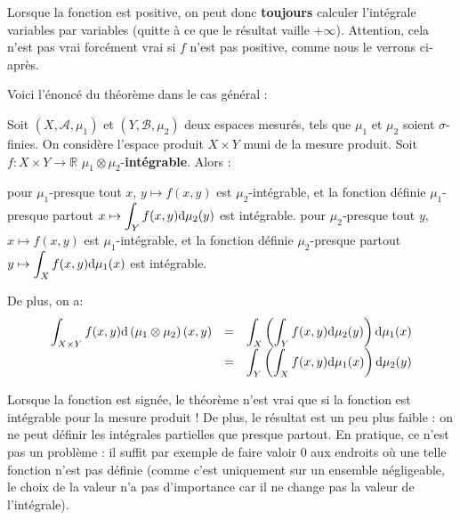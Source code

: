 \documentclass[../integ-proba.tex]{subfiles}
\begin{document}
  \begin{rem}
    Lorsque la fonction est positive, on peut donc \textbf{toujours} calculer l'intégrale variables par variables (quitte à ce que le résultat vaille $+\infty$).
    Attention, cela n'est pas vrai forcément vrai si $f$ n'est pas positive, comme nous le verrons ci-après.
  \end{rem}

  Voici l'énoncé du théorème dans le cas général :

  \begin{thm}
    \label{thm:fubini}
    Soit $\left(X, \mathcal{A}, \mu_1\right)$ et $\left(Y, \mathcal{B}, \mu_2\right)$ deux espaces mesurés, tels que $\mu_1$ et $\mu_2$ soient $\sigma$-finies.
    On considère l'espace produit $X \times Y$ muni de la mesure produit.
    Soit $f:X \times Y \rightarrow \mathbb{R}$ $\mu_1 \otimes \mu_2$-\textbf{intégrable}.
    Alors :
    \begin{itemize}
      \itemb pour $\mu_1$-presque tout $x$, $y \mapsto f(x,y)$ est $\mu_2$-intégrable, et la fonction définie $\mu_1$-presque partout $\displaystyle x \mapsto \int_Y f(x,y) \textnormal{d}\mu_2(y)$ est intégrable.
      \itemb pour $\mu_2$-presque tout $y$, $x \mapsto f(x,y)$ est $\mu_1$-intégrable, et la fonction définie $\mu_2$-presque partout $\displaystyle y \mapsto \int_X f(x,y) \textnormal{d}\mu_1(x)$ est intégrable.
    \end{itemize}

    De plus, on a:
    $$
    {
    \everymath={\displaystyle}
    \begin{array}{rcl}
      \int_{X \times Y} f(x,y) \textnormal{d} \left(\mu_1 \otimes \mu_2 \right) (x,y) & = & \int_X \left( \int_Y f(x,y) \textnormal{d} \mu_2(y) \right) \textnormal{d} \mu_1(x)\\
                                                                                      & = & \int_Y \left( \int_X f(x,y) \textnormal{d} \mu_1(x) \right) \textnormal{d} \mu_2(y)\\
    \end{array}
    }
    $$
  \end{thm}

  \begin{rem}
    Lorsque la fonction est signée, le théorème n'est vrai que si la fonction est intégrable pour la mesure produit !
    De plus, le résultat est un peu plus faible : on ne peut définir les intégrales partielles que presque partout.
    En pratique, ce n'est pas un problème : il suffit par exemple de faire valoir $0$ aux endroits où une telle fonction n'est pas définie (comme c'est uniquement sur un ensemble négligeable, le choix de la valeur n'a pas d'importance car il ne change pas la valeur de l'intégrale).
  \end{rem}
\end{document}
